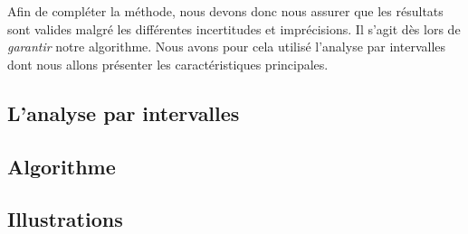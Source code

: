Afin de compl\'eter la m\'ethode, nous devons donc nous assurer que les 
r\'esultats sont valides malgr\'e les diff\'erentes incertitudes et 
impr\'ecisions. Il s'agit d\`es lors de {\it garantir} notre algorithme. Nous 
avons pour cela utilis\'e l'analyse par intervalles dont nous allons pr\'esenter 
les caract\'eristiques principales.

\subsection{L'analyse par intervalles}





\subsection{Algorithme}

\subsection{Illustrations}
